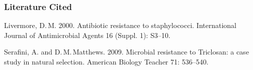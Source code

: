 \documentclass[12pt]{exam}
\newlength{\litindent}
\begin{document}
\begin{questions}
\begin{center}


\end{center}

\end{questions}

\subsubsection*{Literature Cited}

Livermore, D.\,M. 2000. Antibiotic resistance to staphylococci. International Journal of Antimicrobial Agents 16 (Suppl. 1): S3–10.

Serafini, A. and D.\,M.\,Matthews. 2009. Microbial resistance to Triclosan: a case study in natural selection. American Biology Teacher 71: 536–540.
\end{document}
